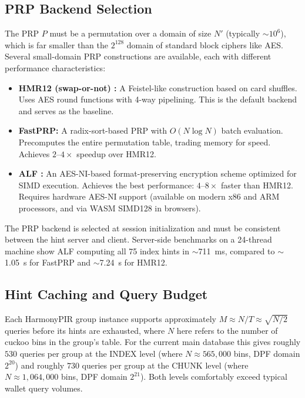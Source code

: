 \subsection{PRP Backend Selection}
\label{sec:prp-backends}

The PRP $P$ must be a permutation over a domain of size $N'$ (typically $\sim 10^6$), which is far smaller than the $2^{128}$ domain of standard block ciphers like AES. Several small-domain PRP constructions are available, each with different performance characteristics:

\begin{itemize}[nolistsep,leftmargin=*]
    \item \textbf{HMR12 (swap-or-not) \cite{hmr12}:} A Feistel-like construction based on card shuffles. Uses AES round functions with 4-way pipelining. This is the default backend and serves as the baseline.

    \item \textbf{FastPRP:} A radix-sort-based PRP with $O(N \log N)$ batch evaluation. Precomputes the entire permutation table, trading memory for speed. Achieves $2$--$4\times$ speedup over HMR12.

    \item \textbf{ALF \cite{alf25}:} An AES-NI-based format-preserving encryption scheme optimized for SIMD execution. Achieves the best performance: $4$--$8\times$ faster than HMR12. Requires hardware AES-NI support (available on modern x86 and ARM processors, and via WASM SIMD128 in browsers).
\end{itemize}

The PRP backend is selected at session initialization and must be consistent between the hint server and client. Server-side benchmarks on a 24-thread machine show ALF computing all 75 index hints in $\sim$711~ms, compared to $\sim$1.05~s for FastPRP and $\sim$7.24~s for HMR12.

\subsection{Hint Caching and Query Budget}
\label{sec:harmony-caching}

Each HarmonyPIR group instance supports approximately $M \approx N/T \approx \sqrt{N/2}$ queries before its hints are exhausted, where $N$ here refers to the number of cuckoo bins in the group's table. For the current main database this gives roughly $530$ queries per group at the INDEX level (where $N \approx 565{,}000$ bins, DPF domain $2^{20}$) and roughly $730$ queries per group at the CHUNK level (where $N \approx 1{,}064{,}000$ bins, DPF domain $2^{21}$). Both levels comfortably exceed typical wallet query volumes.


